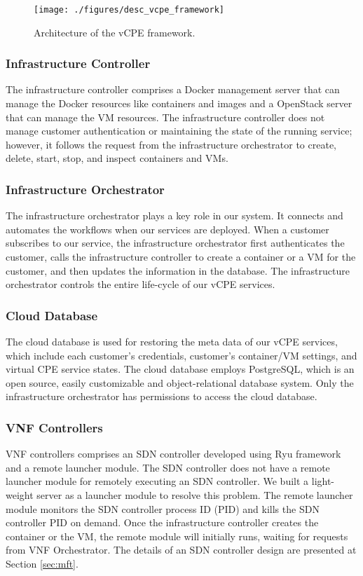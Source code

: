 \documentclass[10pt,journal]{IEEEtran}
\begin{document}
\begin{figure}[!t]
\centering
\texttt{[image: ./figures/desc\_vcpe\_framework]}
\caption{Architecture of the vCPE framework.}
\label{fig:desc_vcpe_framework}
\end{figure}

\subsubsection{Infrastructure Controller}

The infrastructure controller comprises a Docker management server that can manage the Docker resources like containers and images and a OpenStack server that can manage the VM resources. The infrastructure controller does not manage customer authentication or maintaining the state of the running service; however, it follows the request from the infrastructure orchestrator to create, delete, start, stop, and inspect containers and VMs.

\subsubsection{Infrastructure Orchestrator}
The infrastructure orchestrator plays a key role in our system. It connects and automates the workflows when our services are deployed. When a customer subscribes to our service, the infrastructure orchestrator first authenticates the customer, calls the infrastructure controller to create a container or a VM for the customer, and then updates the information in the database. The infrastructure orchestrator controls the entire life-cycle of our vCPE services.

\subsubsection{Cloud Database}
The cloud database is used for restoring the meta data of our vCPE services, which include each customer’s credentials, customer’s container/VM settings, and virtual CPE service states. The cloud database employs PostgreSQL, which is an open source, easily customizable and object-relational database system. Only the infrastructure orchestrator has permissions to access the cloud database.

\subsubsection{VNF Controllers}
VNF controllers comprises an SDN controller developed using Ryu framework \cite{web:ryu} and a remote launcher module. The SDN controller does not have a remote launcher module for remotely executing an SDN controller. We built a light-weight server as a launcher module to resolve this problem. The remote launcher module monitors the SDN controller process ID (PID) and kills the SDN controller PID on demand. Once the infrastructure controller  creates the container or the VM, the remote module will initially runs, waiting for requests from VNF Orchestrator. The details of an SDN controller design are presented at Section \ref{sec:mft}.
\end{document}
